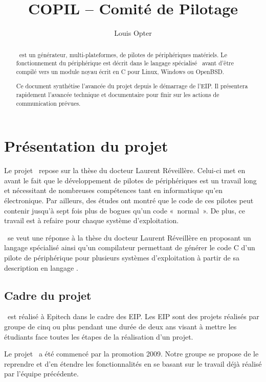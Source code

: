 \documentclass[francais]{rtxreport}
\author{Louis Opter} \title{COPIL -- Comité de Pilotage}
\begin{document}
\maketitle

\begin{abstract}
\rtx\ est un générateur, multi-plateformes, de pilotes de périphériques
matériels. Le fonctionnement du périphérique est décrit dans le langage
spécialisé \rtx\ avant d'être compilé vers un module noyau écrit en C pour
Linux, Windows ou OpenBSD.

Ce document synthétise l'avancée du projet depuis le démarrage de l'EIP. Il
présentera rapidement l’avancée technique et documentaire pour finir sur les
actions de communication prévues.
\end{abstract}

\rtxmaketitleblock

\tableofcontents

\chapter{Présentation du projet}

Le projet \rtx\ repose sur la thèse du docteur Laurent Réveillère. Celui-ci met
en avant le fait que le développement de pilotes de périphériques est un travail
long et nécessitant de nombreuses compétences tant en informatique qu'en
électronique. Par ailleurs, des études ont montré que le code de ces pilotes
peut contenir jusqu'à sept fois plus de bogues qu'un code «~normal~». De plus,
ce travail est à refaire pour chaque système d'exploitation.

\rtx\ se veut une réponse à la thèse du docteur Laurent Réveillère en proposant
un langage spécialisé ainsi qu'un compilateur permettant de générer le code C
d'un pilote de périphérique pour plusieurs systèmes d'exploitation à partir de
sa description en langage \rtx.

\section{Cadre du projet}
\rtx\ est réalisé à Epitech dans le cadre des EIP. Les EIP sont des projets
réalisés par groupe de cinq ou plus pendant une durée de deux ans visant à
mettre les étudiants face toutes les étapes de la réalisation d'un projet.

Le projet \rtx\ a été commencé par la promotion 2009. Notre groupe se propose de
le reprendre et d'en étendre les fonctionnalités en se basant sur le travail déjà
réalisé par l'équipe précédente.
\end{document}
